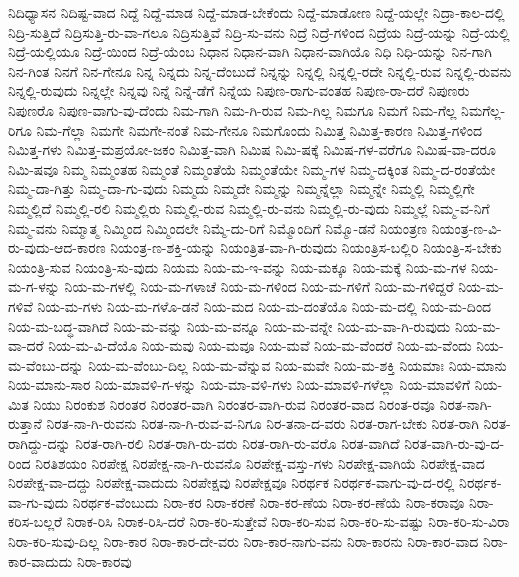 {ನಿದಿಧ್ಯಾಸನ
ನಿದಿಷ್ಟ-ವಾದ
ನಿದ್ದೆ
ನಿದ್ದೆ-ಮಾಡ
ನಿದ್ದೆ-ಮಾಡ-ಬೇಕೆಂದು
ನಿದ್ದೆ-ಮಾಡೋಣ
ನಿದ್ದೆ-ಯಲ್ಲೇ
ನಿದ್ರಾ-ಕಾಲ-ದಲ್ಲಿ
ನಿದ್ರಿ-ಸುತ್ತಿದೆ
ನಿದ್ರಿಸುತ್ತಿ-ರು-ವಾ-ಗಲೂ
ನಿದ್ರಿಸುತ್ತಿವೆ
ನಿದ್ರಿ-ಸು-ವನು
ನಿದ್ರೆ
ನಿದ್ರೆ-ಗಳಿಂದ
ನಿದ್ರೆಯ
ನಿದ್ರೆ-ಯನ್ನು
ನಿದ್ರೆ-ಯಲ್ಲಿ
ನಿದ್ರೆ-ಯಲ್ಲಿಯೂ
ನಿದ್ರೆ-ಯಿಂದ
ನಿದ್ರೆ-ಯೆಂಬ
ನಿಧಾನ
ನಿಧಾನ-ವಾಗಿ
ನಿಧಾನ-ವಾಗಿಯೊ
ನಿಧಿ
ನಿಧಿ-ಯನ್ನು
ನಿನ-ಗಾಗಿ
ನಿನ-ಗಿಂತ
ನಿನಗೆ
ನಿನ-ಗೇನೂ
ನಿನ್ನ
ನಿನ್ನದು
ನಿನ್ನ-ದೆಂಬುದೆ
ನಿನ್ನನ್ನು
ನಿನ್ನಲ್ಲಿ
ನಿನ್ನಲ್ಲಿ-ರದೇ
ನಿನ್ನಲ್ಲಿ-ರುವ
ನಿನ್ನಲ್ಲಿ-ರುವನು
ನಿನ್ನಲ್ಲಿ-ರುವುದು
ನಿನ್ನಲ್ಲೇ
ನಿನ್ನವು
ನಿನ್ನೆ
ನಿನ್ನೆ-ಡೆಗೆ
ನಿನ್ನೆಯ
ನಿಪುಣ-ರಾಗು-ವಂತಹ
ನಿಪುಣ-ರಾ-ದರೆ
ನಿಪುಣರು
ನಿಪುಣರೊ
ನಿಪುಣ-ವಾಗು-ವು-ದೆಂದು
ನಿಮ-ಗಾಗಿ
ನಿಮ-ಗಿ-ರುವ
ನಿಮ-ಗಿಲ್ಲ
ನಿಮಗೂ
ನಿಮಗೆ
ನಿಮ-ಗೆಲ್ಲ
ನಿಮಗೆಲ್ಲ-ರಿಗೂ
ನಿಮ-ಗೆಲ್ಲಾ
ನಿಮಗೇ
ನಿಮಗೇ-ನಂತೆ
ನಿಮ-ಗೇನೂ
ನಿಮಗೊಂದು
ನಿಮಿತ್ತ
ನಿಮಿತ್ತ-ಕಾರಣ
ನಿಮಿತ್ತ-ಗಳಿಂದ
ನಿಮಿತ್ತ-ಗಳು
ನಿಮಿತ್ತ-ಮಪ್ರಯೋ-ಜಕಂ
ನಿಮಿತ್ತ-ವಾಗಿ
ನಿಮಿಷ
ನಿಮಿ-ಷಕ್ಕೆ
ನಿಮಿಷ-ಗಳ-ವರೆಗೂ
ನಿಮಿಷ-ವಾ-ದರೂ
ನಿಮಿ-ಷವೂ
ನಿಮ್ಮ
ನಿಮ್ಮಂತಹ
ನಿಮ್ಮಂತೆ
ನಿಮ್ಮಂತೆಯೆ
ನಿಮ್ಮಂತೆಯೇ
ನಿಮ್ಮ-ಗಳ
ನಿಮ್ಮ-ದಕ್ಕಿಂತ
ನಿಮ್ಮ-ದ-ರಂತೆಯೇ
ನಿಮ್ಮ-ದಾ-ಗಿತ್ತು
ನಿಮ್ಮ-ದಾ-ಗು-ವುದು
ನಿಮ್ಮದು
ನಿಮ್ಮದೇ
ನಿಮ್ಮನ್ನು
ನಿಮ್ಮನ್ನೆಲ್ಲಾ
ನಿಮ್ಮನ್ನೇ
ನಿಮ್ಮಲ್ಲಿ
ನಿಮ್ಮಲ್ಲಿಗೇ
ನಿಮ್ಮಲ್ಲಿದೆ
ನಿಮ್ಮಲ್ಲಿ-ರಲಿ
ನಿಮ್ಮಲ್ಲಿರು
ನಿಮ್ಮಲ್ಲಿ-ರುವ
ನಿಮ್ಮಲ್ಲಿ-ರು-ವನು
ನಿಮ್ಮಲ್ಲಿ-ರು-ವುದು
ನಿಮ್ಮಲ್ಲೆ
ನಿಮ್ಮ-ವ-ನಿಗೆ
ನಿಮ್ಮ-ವನು
ನಿಮ್ಮಾತ್ಮ
ನಿಮ್ಮಿಂದ
ನಿಮ್ಮಿಂದಲೇ
ನಿಮ್ಮೆ-ದು-ರಿಗೆ
ನಿಮ್ಮೊಂದಿಗೆ
ನಿಮ್ಮೊ-ಡನೆ
ನಿಯಂತ್ರಣ
ನಿಯಂತ್ರ-ಣ-ವಿ-ರು-ವುದು-ಆದ-ಕಾರಣ
ನಿಯಂತ್ರ-ಣ-ಶಕ್ತಿ-ಯನ್ನು
ನಿಯಂತ್ರಿತ-ವಾ-ಗಿ-ರುವುದು
ನಿಯಂತ್ರಿಸ-ಬಲ್ಲಿರಿ
ನಿಯಂತ್ರಿ-ಸ-ಬೇಕು
ನಿಯಂತ್ರಿ-ಸುವ
ನಿಯಂತ್ರಿ-ಸು-ವುದು
ನಿಯಮ
ನಿಯ-ಮ-ಇ-ವನ್ನು
ನಿಯ-ಮಕ್ಕೂ
ನಿಯ-ಮಕ್ಕೆ
ನಿಯ-ಮ-ಗಳ
ನಿಯ-ಮ-ಗ-ಳನ್ನು
ನಿಯ-ಮ-ಗಳಲ್ಲಿ
ನಿಯ-ಮ-ಗಳಾಚೆ
ನಿಯ-ಮ-ಗಳಿಂದ
ನಿಯ-ಮ-ಗಳಿಗೆ
ನಿಯ-ಮ-ಗಳಿದ್ದರೆ
ನಿಯ-ಮ-ಗಳಿವೆ
ನಿಯ-ಮ-ಗಳು
ನಿಯ-ಮ-ಗಳೊ-ಡನೆ
ನಿಯ-ಮದ
ನಿಯ-ಮ-ದಂತೆಯೊ
ನಿಯ-ಮ-ದಲ್ಲಿ
ನಿಯ-ಮ-ದಿಂದ
ನಿಯ-ಮ-ಬದ್ಧ-ವಾಗಿದೆ
ನಿಯ-ಮ-ವನ್ನು
ನಿಯ-ಮ-ವನ್ನೂ
ನಿಯ-ಮ-ವನ್ನೇ
ನಿಯ-ಮ-ವಾ-ಗಿ-ರುವುದು
ನಿಯ-ಮ-ವಾ-ದರೆ
ನಿಯ-ಮ-ವಿ-ದೆಯೊ
ನಿಯ-ಮವು
ನಿಯ-ಮವೂ
ನಿಯ-ಮವೆ
ನಿಯ-ಮ-ವೆಂದರೆ
ನಿಯ-ಮ-ವೆಂದು
ನಿಯ-ಮ-ವೆಂಬು-ದನ್ನು
ನಿಯ-ಮ-ವೆಂಬು-ದಿಲ್ಲ
ನಿಯ-ಮ-ವೆನ್ನುವ
ನಿಯ-ಮವೇ
ನಿಯ-ಮ-ಶಕ್ತಿ
ನಿಯಮಾಃ
ನಿಯ-ಮಾನು
ನಿಯ-ಮಾನು-ಸಾರ
ನಿಯ-ಮಾವಳಿ-ಗ-ಳನ್ನು
ನಿಯ-ಮಾ-ವಳಿ-ಗಳು
ನಿಯ-ಮಾವಳಿ-ಗಳೆಲ್ಲಾ
ನಿಯ-ಮಾವಳಿಗೆ
ನಿಯ-ಮಿತ
ನಿಯು
ನಿರಂಕುಶ
ನಿರಂತರ
ನಿರಂತರ-ವಾಗಿ
ನಿರಂತರ-ವಾಗಿ-ರುವ
ನಿರಂತರ-ವಾದ
ನಿರಂತ-ರವೂ
ನಿರತ-ನಾಗಿ-ರುತ್ತಾನೆ
ನಿರತ-ನಾ-ಗಿ-ರುವನು
ನಿರತ-ನಾ-ಗಿ-ರುವ-ವ-ನಿಗೂ
ನಿರ-ತನಾ-ದ-ವರು
ನಿರತ-ರಾಗ-ಬೇಕು
ನಿರತ-ರಾಗಿ
ನಿರತ-ರಾಗಿದ್ದು-ದನ್ನು
ನಿರತ-ರಾಗಿ-ರಲಿ
ನಿರತ-ರಾಗಿ-ರು-ವರು
ನಿರತ-ರಾಗಿ-ರು-ವರೊ
ನಿರತ-ವಾಗಿದೆ
ನಿರತ-ವಾಗಿ-ರು-ವು-ದ-ರಿಂದ
ನಿರತಿಶಯಂ
ನಿರಪೇಕ್ಷ
ನಿರಪೇಕ್ಷ-ನಾ-ಗಿ-ರುವನೊ
ನಿರಪೇಕ್ಷ-ವಸ್ತು-ಗಳು
ನಿರಪೇಕ್ಷ-ವಾಗಿಯೆ
ನಿರಪೇಕ್ಷ-ವಾದ
ನಿರಪೇಕ್ಷ-ವಾ-ದದ್ದು
ನಿರಪೇಕ್ಷ-ವಾದುದು
ನಿರಪೇಕ್ಷವು
ನಿರಪೇಕ್ಷವೂ
ನಿರರ್ಥಕ
ನಿರರ್ಥಕ-ವಾಗು-ವು-ದ-ರಲ್ಲಿ
ನಿರರ್ಥಕ-ವಾ-ಗು-ವುದು
ನಿರರ್ಥಕ-ವೆಂಬುದು
ನಿರಾ-ಕರ
ನಿರಾ-ಕರಣೆ
ನಿರಾ-ಕರ-ಣೆಯ
ನಿರಾ-ಕರ-ಣೆಯೆ
ನಿರಾ-ಕರಾವೂ
ನಿರಾ-ಕರಿಸ-ಬಲ್ಲರೆ
ನಿರಾಕ-ರಿಸಿ
ನಿರಾಕ-ರಿಸಿ-ದರೆ
ನಿರಾ-ಕರಿ-ಸುತ್ತೇವೆ
ನಿರಾ-ಕರಿ-ಸುವ
ನಿರಾ-ಕರಿ-ಸು-ವಷ್ಟು
ನಿರಾ-ಕರಿ-ಸು-ವಿರಾ
ನಿರಾ-ಕರಿ-ಸುವು-ದಿಲ್ಲ
ನಿರಾ-ಕಾರ
ನಿರಾ-ಕಾರ-ದೇ-ವರು
ನಿರಾ-ಕಾರ-ನಾಗು-ವನು
ನಿರಾ-ಕಾರನು
ನಿರಾ-ಕಾರ-ವಾದ
ನಿರಾ-ಕಾರ-ವಾದುದು
ನಿರಾ-ಕಾರವು
}
